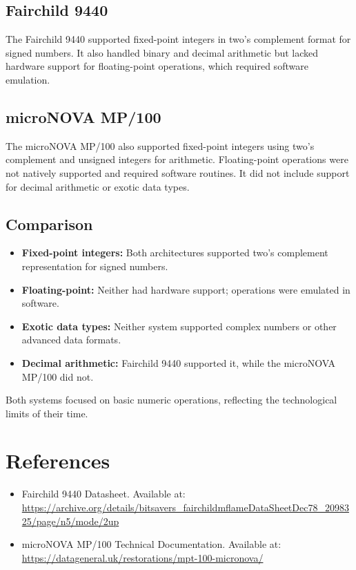 \documentclass[a4paper,12pt]{article}
\begin{document}
\subsection{Fairchild 9440}

The Fairchild 9440 supported fixed-point integers in two's complement format for signed numbers. It also handled binary and decimal arithmetic but lacked hardware support for floating-point operations, which required software emulation.

\subsection{microNOVA MP/100}

The microNOVA MP/100 also supported fixed-point integers using two's complement and unsigned integers for arithmetic. Floating-point operations were not natively supported and required software routines. It did not include support for decimal arithmetic or exotic data types.

\subsection{Comparison}

\begin{itemize}
    \item \textbf{Fixed-point integers:} Both architectures supported two's complement representation for signed numbers.
    \item \textbf{Floating-point:} Neither had hardware support; operations were emulated in software.
    \item \textbf{Exotic data types:} Neither system supported complex numbers or other advanced data formats.
    \item \textbf{Decimal arithmetic:} Fairchild 9440 supported it, while the microNOVA MP/100 did not.
\end{itemize}

Both systems focused on basic numeric operations, reflecting the technological limits of their time.

\section*{References}

\begin{itemize}
    \item Fairchild 9440 Datasheet. Available at: \url{https://archive.org/details/bitsavers_fairchildmflameDataSheetDec78_2098325/page/n5/mode/2up}
    \item microNOVA MP/100 Technical Documentation. Available at: \url{https://datageneral.uk/restorations/mpt-100-micronova/}
\end{itemize}
\end{document}
